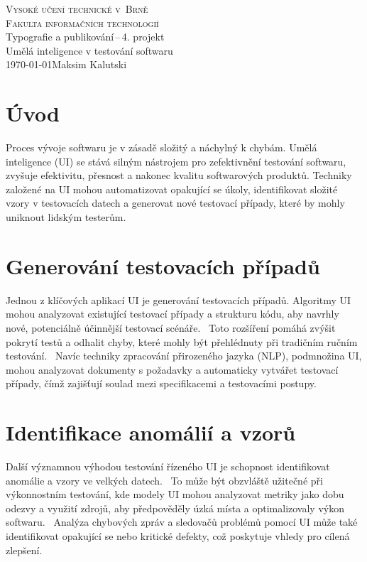 \documentclass[a4paper, 11pt]{article}
\begin{document}
    \begin{titlepage}
        \begin{center}
            \Huge \textsc{Vysoké učení technické v~Brně} \\
            \huge \textsc{Fakulta informačních technologií} \\
            \LARGE Typografie a publikování\,--\,4. projekt \\
            \Huge Umělá inteligence v testování softwaru \\
            {\Large \today \hfill Maksim Kalutski}
        \end{center}
    \end{titlepage}

\section{Úvod}
Proces vývoje softwaru je v zásadě složitý a náchylný k chybám. Umělá inteligence (UI) se stává silným nástrojem pro zefektivnění testování softwaru, zvyšuje efektivitu, přesnost a nakonec kvalitu softwarových produktů. Techniky založené na UI mohou automatizovat opakující se úkoly, identifikovat složité vzory v testovacích datech a generovat nové testovací případy, které by mohly uniknout lidským testerům.

\section{Generování testovacích případů}
Jednou z klíčových aplikací UI je generování testovacích případů. Algoritmy UI mohou analyzovat existující testovací případy a strukturu kódu, aby navrhly nové, potenciálně účinnější testovací scénáře.~\cite{MonographMitchellOlsthoorn2022} Toto rozšíření pomáhá zvýšit pokrytí testů a odhalit chyby, které mohly být přehlédnuty při tradičním ručním testování.~\cite{SerialPublicationAnjanaPerera2020} Navíc techniky zpracování přirozeného jazyka (NLP), podmnožina UI, mohou analyzovat dokumenty s požadavky a automaticky vytvářet testovací případy, čímž zajišťují soulad mezi specifikacemi a testovacími postupy.~\cite{ElectronicDocumentJacinthPaul2023}

\section{Identifikace anomálií a vzorů}
Další významnou výhodou testování řízeného UI je schopnost identifikovat anomálie a vzory ve velkých datech.~\cite{ThesesMikaelMäkelä2019} To může být obzvláště užitečné při výkonnostním testování, kde modely UI mohou analyzovat metriky jako dobu odezvy a využití zdrojů, aby předpověděly úzká místa a optimalizovaly výkon softwaru.~\cite{ArticleKhloudAlJallad2020} Analýza chybových zpráv a sledovačů problémů pomocí UI může také identifikovat opakující se nebo kritické defekty, což poskytuje vhledy pro cílená zlepšení.~\cite{ElectronicDocumentMarwanHaddad2023}
\end{document}
